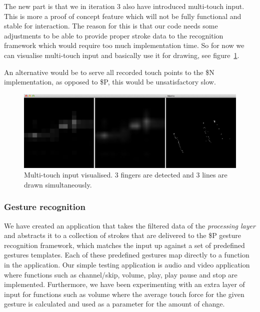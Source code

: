 The new part is that we in iteration 3 also have introduced multi-touch input.
This is more a proof of concept feature which will not be fully functional and stable for interaction. The reason for this is that our code needs some adjustments to be able to provide proper stroke data to the recognition framework which would require too much implementation time.
So for now we can visualise multi-touch input and basically use it for drawing, see figure~\ref{fig:textiletouch:multitouch}.

An alternative would be to serve all recorded touch points to the \$N implementation, as opposed to \$P,  this would be unsatisfactory slow.

\begin{figure}[h]
  \centering
      \includegraphics[width=.9\textwidth]{figures/touch/tt_multitouch}
  \caption[The data flow from sensor to application.]
   {Multi-touch input visualised. 3 fingers are detected and 3 lines are drawn simultaneously.}
   \label{fig:textiletouch:multitouch}
\end{figure}

\subsubsection{Gesture recognition} 
\label{ch:textiletouch:gesture_implementation}

We have created an application that takes the filtered data of the \emph{processing layer} and abstracts it to a collection of strokes that are delivered to the \$P gesture recognition framework, which matches the input up against a set of predefined gestures templates.
Each of these predefined gestures map directly to a function in the application.
Our simple testing application is audio and video application where functions such as channel/skip, volume, play, play pause and stop are implemented.
Furthermore, we have been experimenting with an extra layer of input for functions such as volume where the average touch force for the given gesture is calculated and used as a parameter for the amount of  change.

